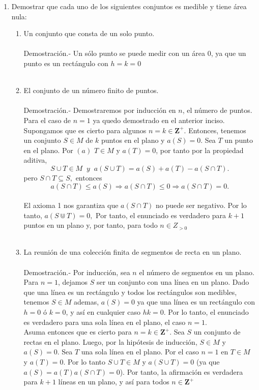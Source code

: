     \begin{enumerate}[ \bfseries 1.]

	\item Demostrar que cada uno de los siguientes conjuntos es medible y tiene área nula:

	    \begin{enumerate}[\bfseries (a)]

	    \item Un conjunto que consta de un solo punto.\\\\
	    Demostración.-\; Un sólo punto se puede medir con un área $0$, ya que un punto es un rectángulo con $h=k=0$\\\\

	    \item El conjunto de un número finito de puntos.\\\\
		Demostración.-\; Demostraremos por inducción en $n$, el número de puntos. Para el caso de $n=1$ ya quedo demostrado en el anterior inciso. Supongamos que es cierto para algunos $n=k\in \mathbf{Z}^+$. Entonces, tenemos un conjunto $S \in M$ de $k$ puntos en el plano y $a(S)=0$. Sea $T$ un punto en el plano. Por $(a)$ $T \in M$ y $a(T)=0$, por tanto por la propiedad aditiva, $$S\cup T \in M \;\; y \;\; a(S\cup T)=a(S)+a(T) - a(S\cap T).$$ pero $S\cap T \subseteq S,$ entonces $$a(S \cap T)\leq a(S) \Rightarrow a(S \cap T)\leq 0 \Rightarrow a(S \cap T)=0.$$\\ El axioma 1 nos garantiza que $a(S \cap T)$ no puede ser negativo. Por lo tanto, $a(S \Cup T)=0,$ Por tanto, el enunciado es verdadero para $k+1$ puntos en un plano y, por tanto, para todo $n \in Z_{>0}$\\\\

	    \item La reunión de una colección finita de segmentos de recta en un plano.\\\\
	    Demostración.-\; Por inducción, sea $n$ el número de segmentos en un plano. Para $n=1$, dejamos $S$ ser un conjunto con una línea en un plano. Dado que una línea es un rectángulo y todos los rectángulos son medibles, tenemos $S\in M$ ademas, $a(S)=0$ ya que una línea es un rectángulo con $h=0$ ó $k=0$, y así en cualquier caso $hk=0$. Por lo tanto, el enunciado es verdadero para una sola línea en el plano, el caso $n=1$.\\
		    Asuma entonces que es cierto para $n=k \in \mathbf{Z}^+$. Sea $S$ un conjunto de rectas en el plano. Luego, por la hipótesis de inducción, $S\in M$ y $a(S)=0$. Sea $T$ una sola línea en el plano. Por el caso $n=1$ en $T\in M$ y $a(T)=0$. Por lo tanto $S\cup T \in M$ y $a(S\cup T)=0$ (ya que $a(S)=a(T)a(S\cap T)=0$). Por tanto, la afirmación es verdadera para $k+1$ líneas en un plano, y así para todos $n\in \mathbf{Z}^+$\\\\


\end{enumerate}
\end{enumerate}
